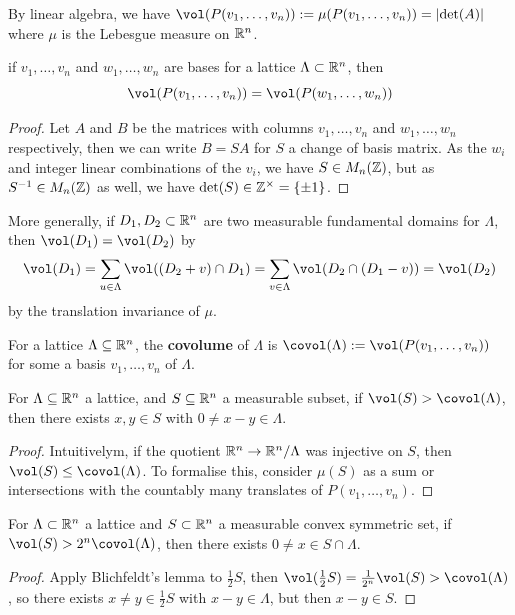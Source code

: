 \documentclass{article}
\begin{document}
By linear algebra, we have $\vol(P(v_1,\ldots,v_n)) := \mu(P(v_1,\ldots,v_n)) = \abs{\det(A)}$ where $\mu$ is the Lebesgue measure on $\mathbb{R}^n$.

\begin{lemma}
    if $v_1,\ldots,v_n$ and $w_1,\ldots,w_n$ are bases for a lattice $\Lambda\subset \mathbb{R}^n$, then \[\vol(P(v_1,\ldots,v_n))=\vol(P(w_1,\ldots,w_n))\]
    \begin{proof}
        Let $A$ and $B$ be the matrices with columns $v_1,\ldots,v_n$ and $w_1,\ldots,w_n$ respectively, then we can write $B=SA$ for $S$ a change of basis matrix. As the $w_i$ and integer linear combinations of the $v_i$, we have $S\in M_n(\mathbb{Z})$, but as $S^{-1}\in M_n(\mathbb{Z})$ as well, we have $\det(S)\in \mathbb{Z}^\times = \{\pm 1\}$.
    \end{proof}
\end{lemma}

More generally, if $D_1,D_2\subset \mathbb{R}^n$ are two measurable fundamental domains for $\Lambda$, then $\vol(D_1)=\vol(D_2)$ by  \[
\vol(D_1) = \sum_{u\in\Lambda}\vol((D_2+v)\cap D_1) = \sum_{v\in \Lambda}\vol(D_2\cap (D_1-v)) = \vol(D_2)
\] by the translation invariance of $\mu$.

\begin{definition}
    For a lattice $\Lambda \subseteq \mathbb{R}^n$, the \textbf{covolume} of $\Lambda$ is $\covol(\Lambda):=\vol(P(v_1,\ldots,v_n))$ for some a basis $v_1,\ldots,v_n$ of $\Lambda$.
\end{definition}

\begin{lemma}
    For $\Lambda\subseteq \mathbb{R}^n$ a lattice, and $S\subseteq \mathbb{R}^n$ a measurable subset, if $\vol(S)>\covol(\Lambda)$, then there exists $x,y\in S$ with $0\neq x-y \in \Lambda$.\begin{proof}
        Intuitivelym, if the quotient $\mathbb{R}^n\rightarrow \mathbb{R}^n/\Lambda$ was injective on $S$, then $\vol(S) \leq \covol(\Lambda)$. To formalise this, consider $\mu(S)$ as a sum or intersections with the countably many translates of $P(v_1,\ldots,v_n)$.
    \end{proof}
\end{lemma}

\begin{theorem}
    For $\Lambda\subset \mathbb{R}^n$ a lattice and $S\subset \mathbb{R}^n$ a measurable convex symmetric set, if $\vol(S) > 2^n\covol(\Lambda)$, then there exists $0\neq x\in S\cap \Lambda$.\begin{proof}
        Apply Blichfeldt's lemma to $\frac{1}{2}S$, then $\vol(\frac{1}{2}S) = \frac{1}{2^n}\vol(S)>\covol(\Lambda)$, so there exists $x\neq y\in \frac{1}{2}S$ with $x-y\in \Lambda$, but then $x-y\in S$.
    \end{proof}
\end{theorem}
\end{document}
